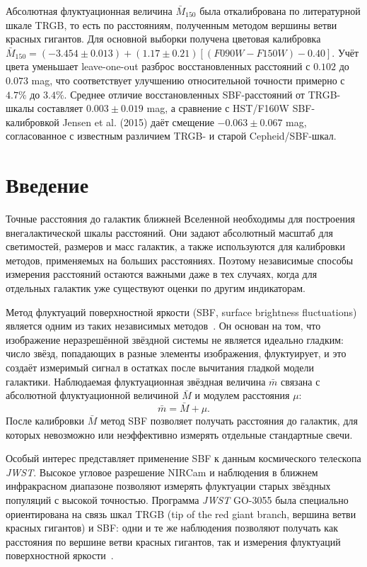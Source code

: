 \documentclass[12pt,a4paper]{article}
\begin{document}
Абсолютная флуктуационная величина $\bar{M}_{150}$ была откалибрована по литературной шкале TRGB, то есть по расстояниям, полученным методом вершины ветви красных гигантов. Для основной выборки получена цветовая калибровка $\bar{M}_{150}=(-3.454\pm0.013)+(1.17\pm0.21)[(F090W-F150W)-0.40]$. Учёт цвета уменьшает leave-one-out разброс восстановленных расстояний с $0.102$ до $0.073$ mag, что соответствует улучшению относительной точности примерно с $4.7\%$ до $3.4\%$. Среднее отличие восстановленных SBF-расстояний от TRGB-шкалы составляет $0.003\pm0.019$ mag, а сравнение с HST/F160W SBF-калибровкой Jensen et al. (2015) даёт смещение $-0.063\pm0.067$ mag, согласованное с известным различием TRGB- и старой Cepheid/SBF-шкал.

\tableofcontents
\clearpage

\section{Введение}

Точные расстояния до галактик ближней Вселенной необходимы для построения внегалактической шкалы расстояний. Они задают абсолютный масштаб для светимостей, размеров и масс галактик, а также используются для калибровки методов, применяемых на больших расстояниях. Поэтому независимые способы измерения расстояний остаются важными даже в тех случаях, когда для отдельных галактик уже существуют оценки по другим индикаторам.

Метод флуктуаций поверхностной яркости (SBF, surface brightness fluctuations) является одним из таких независимых методов~\cite{TonrySchneider1988}. Он основан на том, что изображение неразрешённой звёздной системы не является идеально гладким: число звёзд, попадающих в разные элементы изображения, флуктуирует, и это создаёт измеримый сигнал в остатках после вычитания гладкой модели галактики. Наблюдаемая флуктуационная звёздная величина $\bar{m}$ связана с абсолютной флуктуационной величиной $\bar{M}$ и модулем расстояния $\mu$:
\begin{equation}
    \bar{m} = \bar{M} + \mu.
\end{equation}
После калибровки $\bar{M}$ метод SBF позволяет получать расстояния до галактик, для которых невозможно или неэффективно измерять отдельные стандартные свечи.

Особый интерес представляет применение SBF к данным космического телескопа \textit{JWST}. 
Высокое угловое разрешение NIRCam и наблюдения в ближнем инфракрасном диапазоне позволяют измерять флуктуации старых звёздных популяций с высокой точностью. 
Программа \textit{JWST} GO-3055 была специально ориентирована на связь шкал TRGB (tip of the red giant branch, вершина ветви красных гигантов) и SBF: одни и те же наблюдения позволяют получать как расстояния по вершине ветви красных гигантов, так и измерения флуктуаций поверхностной яркости~\cite{Anand2024,Jensen2025}.
\end{document}

